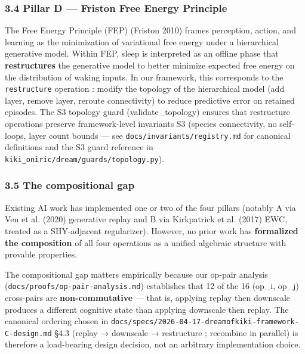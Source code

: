 \documentclass[
]{article}
\begin{document}
\subsubsection{3.4 Pillar D --- Friston Free Energy
Principle}\label{pillar-d-friston-free-energy-principle}

The Free Energy Principle (FEP) (Friston 2010) frames perception,
action, and learning as the minimization of variational free energy
under a hierarchical generative model. Within FEP, sleep is interpreted
as an offline phase that \textbf{restructures} the generative model to
better minimize expected free energy on the distribution of waking
inputs. In our framework, this corresponds to the \texttt{restructure}
operation : modify the topology of the hierarchical model (add layer,
remove layer, reroute connectivity) to reduce predictive error on
retained episodes. The S3 topology guard (validate\_topology) ensures
that restructure operations preserve framework-level invariants S3
(species connectivity, no self-loops, layer count bounds --- see
\texttt{docs/invariants/registry.md} for canonical definitions and the
S3 guard reference in \texttt{kiki\_oniric/dream/guards/topology.py}).

\subsubsection{3.5 The compositional gap}\label{the-compositional-gap-1}

Existing AI work has implemented one or two of the four pillars (notably
A via Ven et al. (2020) generative replay and B via {Kirkpatrick et al.}
(2017) EWC, treated as a SHY-adjacent regularizer). However, no prior
work has \textbf{formalized the composition} of all four operations as a
unified algebraic structure with provable properties.

The compositional gap matters empirically because our op-pair analysis
(\texttt{docs/proofs/op-pair-analysis.md}) establishes that 12 of the 16
(op\_i, op\_j) cross-pairs are \textbf{non-commutative} --- that is,
applying replay then downscale produces a different cognitive state than
applying downscale then replay. The canonical ordering chosen in
\texttt{docs/specs/2026-04-17-dreamofkiki-framework-C-design.md} §4.3
(replay → downscale → restructure ; recombine in parallel) is therefore
a load-bearing design decision, not an arbitrary implementation choice.
\end{document}
